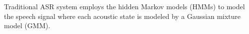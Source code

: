 \documentclass{article}
\begin{document}
Traditional ASR system employs the hidden Markov models (HMMs) to model the speech signal where each acoustic state is modeled by a Gaussian mixture model (GMM). 





\end{document}
